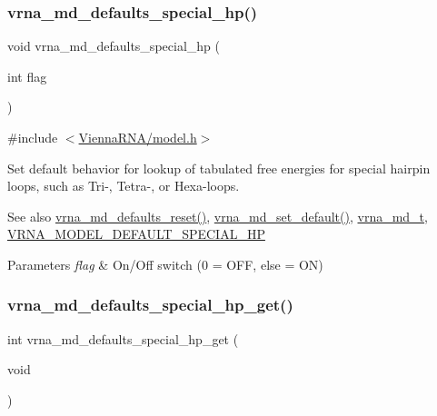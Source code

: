 \subsubsection{\texorpdfstring{vrna\_md\_defaults\_special\_hp()}{vrna\_md\_defaults\_special\_hp()}}
{\footnotesize\ttfamily void vrna\+\_\+md\+\_\+defaults\+\_\+special\+\_\+hp (\begin{DoxyParamCaption}\item[{int}]{flag }\end{DoxyParamCaption})}



{\ttfamily \#include $<$\mbox{\hyperlink{model_8h}{Vienna\+R\+N\+A/model.\+h}}$>$}



Set default behavior for lookup of tabulated free energies for special hairpin loops, such as Tri-\/, Tetra-\/, or Hexa-\/loops. 

\begin{DoxySeeAlso}{See also}
\mbox{\hyperlink{group__model__details_ga70834424cf804d149937de89f80ceb45}{vrna\+\_\+md\+\_\+defaults\+\_\+reset()}}, \mbox{\hyperlink{group__model__details_ga8ac6ff84936282436f822644bf841f66}{vrna\+\_\+md\+\_\+set\+\_\+default()}}, \mbox{\hyperlink{group__model__details_ga1f8a10e12a0a1915f2a4eff0b28ea17c}{vrna\+\_\+md\+\_\+t}}, \mbox{\hyperlink{group__model__details_gabd1ab224e1048defd45c165ed7d1c108}{V\+R\+N\+A\+\_\+\+M\+O\+D\+E\+L\+\_\+\+D\+E\+F\+A\+U\+L\+T\+\_\+\+S\+P\+E\+C\+I\+A\+L\+\_\+\+HP}} 
\end{DoxySeeAlso}

\begin{DoxyParams}{Parameters}
{\em flag} & On/\+Off switch (0 = O\+FF, else = ON) \\
\hline
\end{DoxyParams}
\mbox{\label{group__model__details_ga1d68a6efdaa1253cc63fd9cd06452559}} 
\subsubsection{\texorpdfstring{vrna\_md\_defaults\_special\_hp\_get()}{vrna\_md\_defaults\_special\_hp\_get()}}
{\footnotesize\ttfamily int vrna\+\_\+md\+\_\+defaults\+\_\+special\+\_\+hp\+\_\+get (\begin{DoxyParamCaption}\item[{void}]{ }\end{DoxyParamCaption})}



